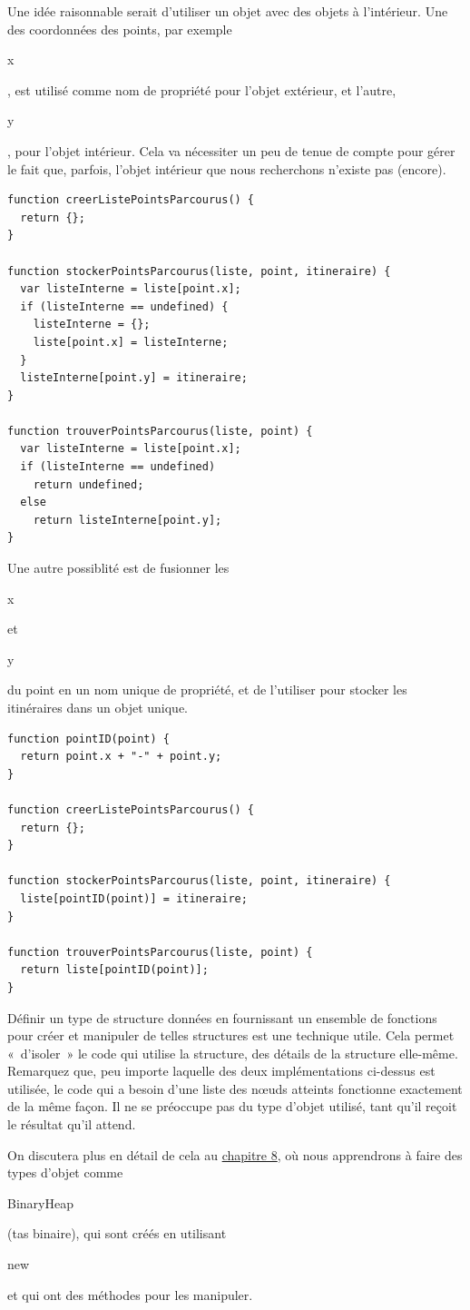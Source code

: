 \documentclass{FramateX}
\renewcommand{\texttt}[1]{\begin{sffamily}{#1}\end{sffamily}}
\begin{document}
Une idée raisonnable serait d'utiliser un objet avec des objets à
l'intérieur. Une des coordonnées des points, par exemple \texttt{x}, est
utilisé comme nom de propriété pour l'objet extérieur, et l'autre,
\texttt{y}, pour l'objet intérieur. Cela va nécessiter un peu de tenue
de compte pour gérer le fait que, parfois, l'objet intérieur que nous
recherchons n'existe pas (encore).

\begin{lstlisting}
function creerListePointsParcourus() {
  return {};
}

function stockerPointsParcourus(liste, point, itineraire) {
  var listeInterne = liste[point.x];
  if (listeInterne == undefined) {
    listeInterne = {};
    liste[point.x] = listeInterne;
  }
  listeInterne[point.y] = itineraire;
}

function trouverPointsParcourus(liste, point) {
  var listeInterne = liste[point.x];
  if (listeInterne == undefined)
    return undefined;
  else
    return listeInterne[point.y];
}
\end{lstlisting}
Une autre possiblité est de fusionner les \texttt{x} et \texttt{y} du
point en un nom unique de propriété, et de l'utiliser pour stocker les
itinéraires dans un objet unique.

\begin{lstlisting}
function pointID(point) {
  return point.x + "-" + point.y;
}

function creerListePointsParcourus() {
  return {};
}

function stockerPointsParcourus(liste, point, itineraire) {
  liste[pointID(point)] = itineraire;
}

function trouverPointsParcourus(liste, point) {
  return liste[pointID(point)];
}
\end{lstlisting}
\begin{center}\end{center}

Définir un type de structure données en fournissant un ensemble de
fonctions pour créer et manipuler de telles structures est une technique
utile. Cela permet «~d'isoler~» le code qui utilise la structure, des
détails de la structure elle-même. Remarquez que, peu importe laquelle
des deux implémentations ci-dessus est utilisée, le code qui a besoin
d'une liste des nœuds atteints fonctionne exactement de la même façon.
Il ne se préoccupe pas du type d'objet utilisé, tant qu'il reçoit le
résultat qu'il attend.

On discutera plus en détail de cela au \href{chapter8.html}{chapitre 8},
où nous apprendrons à faire des types d'objet comme \texttt{BinaryHeap}
(tas binaire), qui sont créés en utilisant \texttt{new} et qui ont des
méthodes pour les manipuler.
\end{document}
